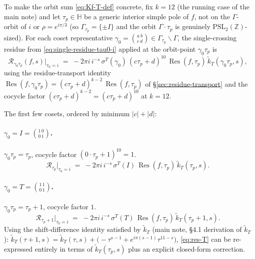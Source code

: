 \documentclass[11pt]{article}
\newcommand{\HH}{\mathbb{H}}
\newcommand{\ZZ}{\mathbb{Z}}
\DeclareMathOperator{\Res}{Res}
\begin{document}
To make the orbit sum \eqref{eq:Kf-T-def} concrete, fix $k = 12$ (the
running case of the main note) and let $\tau_p \in \HH$ be a generic
interior simple pole of $f$, not on the $\Gamma$-orbit of $i$ or
$\rho = e^{i\pi/3}$ (so $\Gamma_{\tau_p} = \{\pm I\}$ and the orbit
$\Gamma\cdot\tau_p$ is genuinely $\mathrm{PSL}_2(\ZZ)$-sized).  For each coset
representative $\gamma_0 = \binom{a\ b}{c\ d} \in \Gamma_{\tau_p}\backslash\Gamma$,
the single-crossing residue from \eqref{eq:single-residue-tau0-i}
applied at the orbit-point $\gamma_0\tau_p$ is
\begin{equation}\label{eq:single-orbit-residue-k12}
  \mathcal{R}_{\gamma_0\tau_p}(f, s)\bigl|_{\tau_0 = i}
  \;=\; -2\pi i\,i^{-s}\,\sigma^T(\gamma_0)\,(c\tau_p + d)^{10}\,
  \Res(f, \tau_p)\,\widetilde{k}_T(\gamma_0\tau_p, s),
\end{equation}
using the residue-transport identity $\Res(f, \gamma_0\tau_p) =
(c\tau_p + d)^{k - 2}\,\Res(f, \tau_p)$ of \S\ref{sec:residue-transport}
and the cocycle factor $(c\tau_p + d)^{k - 2} = (c\tau_p + d)^{10}$ at
$k = 12$.

The first few cosets, ordered by minimum $|c| + |d|$:

\paragraph{$\gamma_0 = I = \binom{1\,0}{0\,1}$.}
$\gamma_0\tau_p = \tau_p$, cocycle factor $(0\cdot\tau_p + 1)^{10} = 1$.
\begin{equation}\label{eq:res-I}
  \mathcal{R}_{\tau_p}\bigl|_{\tau_0=i}
  \;=\; -2\pi i\,i^{-s}\,\sigma^T(I)\,\Res(f, \tau_p)\,
  \widetilde{k}_T(\tau_p, s).
\end{equation}

\paragraph{$\gamma_0 = T = \binom{1\,1}{0\,1}$.}
$\gamma_0\tau_p = \tau_p + 1$, cocycle factor $1$.
\begin{equation}\label{eq:res-T}
  \mathcal{R}_{\tau_p + 1}\bigl|_{\tau_0=i}
  \;=\; -2\pi i\,i^{-s}\,\sigma^T(T)\,\Res(f, \tau_p)\,
  \widetilde{k}_T(\tau_p + 1, s).
\end{equation}
Using the shift-difference identity satisfied by $\widetilde{k}_T$
(main note, \S 4.1 derivation of $\widetilde{k}_T$):
$\widetilde{k}_T(\tau + 1, s) = \widetilde{k}_T(\tau, s)
  + \bigl(-\tau^{s-1} + e^{i\pi(s-1)}\tau^{11-s}\bigr)$,
\eqref{eq:res-T} can be re-expressed entirely in terms of
$\widetilde{k}_T(\tau_p, s)$ plus an explicit closed-form correction.
\end{document}
